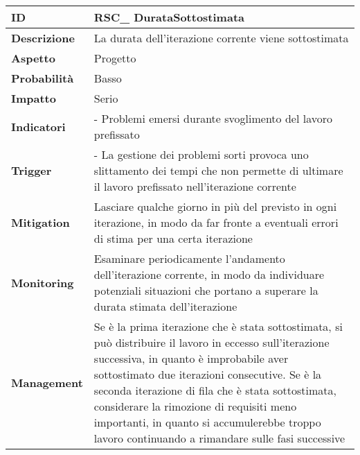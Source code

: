 \begin{tabular}{|p{2.2cm}|p{9.6cm}| }
 	\hline
	\textbf{ID} & RSC\_ DurataSottostimata\\ [0.5ex] 
	\hline
	\textbf{Descrizione} & La durata dell'iterazione corrente viene sottostimata \\ 
	\hline
	\textbf{Aspetto} &  Progetto \\
	\hline
	\textbf{Probabilità} & Basso\\ 
	\hline
	\textbf{Impatto} & Serio\\
	\hline
	\textbf{Indicatori} & - Problemi emersi durante svoglimento del lavoro prefissato\\
	\hline
	\textbf{Trigger} & - La gestione dei problemi sorti provoca uno slittamento dei tempi che non permette di ultimare il lavoro prefissato nell'iterazione corrente\\
	\hline
	\textbf{Mitigation} & Lasciare qualche giorno in più del previsto in ogni iterazione, in modo da far fronte a eventuali errori di stima per una certa iterazione\\ 
	\hline
	\textbf{Monitoring} & Esaminare periodicamente l'andamento dell'iterazione corrente, in modo da individuare potenziali situazioni che portano a superare la durata stimata dell'iterazione\\ 
	\hline
	\textbf{Management} & Se è la prima iterazione che è stata sottostimata, si può distribuire il lavoro in eccesso sull'iterazione successiva, in quanto è improbabile aver sottostimato due iterazioni consecutive. Se è la seconda iterazione di fila che è stata sottostimata, considerare la rimozione di requisiti meno importanti, in quanto si accumulerebbe troppo lavoro continuando a rimandare sulle fasi successive \\ 
	\hline
\end{tabular}


